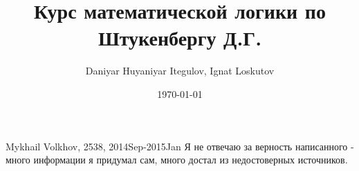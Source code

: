 \documentclass[12pt]{article}
\author{Daniyar Huyaniyar Itegulov, Ignat Loskutov}
\date{\today}
\title{Курс математической логики по Штукенбергу Д.Г.}
\newcommand{\+}{\lambda}
\begin{document}
\theoremstyle{definition}
\newtheorem*{definition}{Определение}%
\newtheorem*{example}{Пример}
\newtheorem{theorem}{Теорема}[section]
\newtheorem{axiom}{Аксиома}[section]
\newtheorem{lemma}[theorem]{Лемма}


\maketitle
\tableofcontents


Mykhail Volkhov, 2538, 2014Sep-2015Jan
Я не отвечаю за верность написанного - много информации
я придумал сам, много достал из недостоверных источников.








\end{document}
